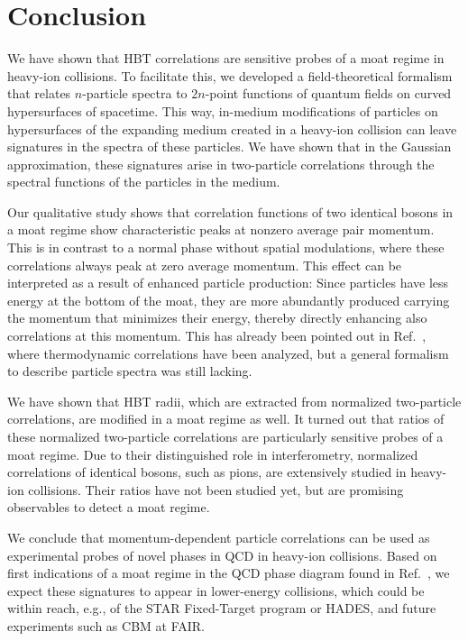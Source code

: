 \documentclass[reprint,superscriptaddress,english,preprintnumbers,amsmath,amssymb,aps,prx]{revtex4-2}
\begin{document}
\section{Conclusion}\label{sec:conc}

We have shown that HBT correlations are sensitive probes of a moat regime in heavy-ion collisions. To facilitate this, we developed a field-theoretical formalism that relates $n$-particle spectra to $2n$-point functions of quantum fields on curved hypersurfaces of spacetime. This way, in-medium modifications of particles on hypersurfaces of the expanding medium created in a heavy-ion collision can leave signatures in the spectra of these particles. We have shown that in the Gaussian approximation, these signatures arise in two-particle correlations through the spectral functions of the particles in the medium.

Our qualitative study shows that 
correlation functions of two identical bosons in a moat regime show characteristic peaks at nonzero average pair momentum. This is in contrast to a normal phase without spatial modulations, where these correlations always peak at zero average momentum. This effect can be interpreted as a result of enhanced particle production: Since particles have less energy at the bottom of the moat, they are more abundantly produced carrying the momentum that minimizes their energy, thereby directly enhancing also correlations at this momentum. This has already been pointed out in Ref.\ \cite{Pisarski:2021qof}, where thermodynamic correlations have been analyzed, but a general formalism to describe particle spectra was still lacking. 

We have shown that HBT radii, which are extracted from normalized two-particle correlations, are modified in a moat regime as well.
It turned out that ratios of these normalized two-particle correlations are particularly sensitive probes of a moat regime. Due to their distinguished role in interferometry, normalized correlations of identical bosons, such as pions, are extensively studied in heavy-ion collisions. Their ratios have not been studied yet, but are promising observables to detect a moat regime.

We conclude that momentum-dependent particle correlations can be used as experimental probes of novel phases in QCD in heavy-ion collisions. Based on first indications of a moat regime in the QCD phase diagram found in Ref.\ \cite{Fu:2019hdw}, we expect these signatures to appear in lower-energy collisions, which could be within reach, e.g., of the STAR Fixed-Target program or HADES, and future experiments such as CBM at FAIR.
\end{document}
